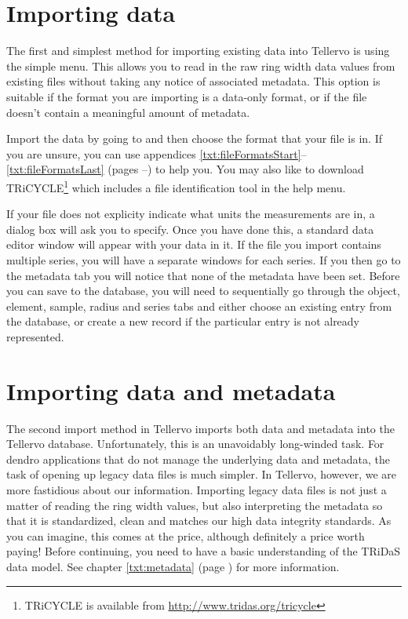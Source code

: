 \section{Importing data}
The first and simplest method for importing existing data into Tellervo is using the simple  menu.  This allows you to read in the raw ring width data values from existing files without taking any notice of associated metadata.  This option is suitable if the format you are importing is a data-only format, or if the file doesn't contain a meaningful amount of metadata.


Import the data by going to  and then choose the format that your file is in.  If you are unsure, you can use appendices \ref{txt:fileFormatsStart}--\ref{txt:fileFormatsLast} (pages \pageref{txt:fileFormatsStart}--\pageref{txt:fileFormatsEnd}) to help you.  You may also like to download TRiCYCLE\footnote{TRiCYCLE is available from \url{http://www.tridas.org/tricycle}} which includes a file identification tool in the help menu.

If your file does not explicity indicate what units the measurements are in, a dialog box will ask you to specify.  Once you have done this, a standard data editor window will appear with your data in it.  If the file you import contains multiple series, you will have a separate windows for each series.  If you then go to the metadata tab you will notice that none of the metadata have been set.  Before you can save to the database, you will need to sequentially go through the object, element, sample, radius and series tabs and either choose an existing entry from the database, or create a new record if the particular entry is not already represented.  


\section{Importing data and metadata}

The second import method in Tellervo imports both data and metadata into the Tellervo database.  Unfortunately, this is an unavoidably long-winded task.  For dendro applications that do not manage the underlying data and metadata, the task of opening up legacy data files is much simpler.  In Tellervo, however, we are more fastidious about our information.  Importing legacy data files is not just a matter of reading the ring width values, but also interpreting the metadata so that it is standardized, clean and matches our high data integrity standards.  As you can imagine, this comes at the price, although definitely a price worth paying!  Before continuing, you need to have a basic understanding of the TRiDaS data model.  See chapter \ref{txt:metadata} (page \pageref{txt:metadata}) for more information.




